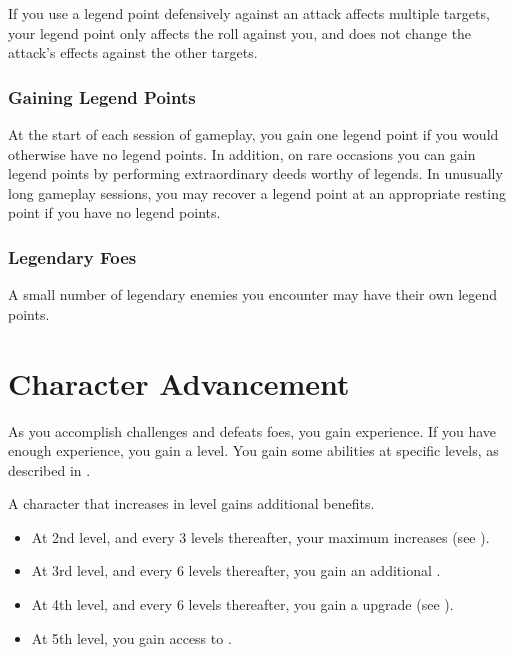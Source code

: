         If you use a legend point defensively against an attack affects multiple targets, your legend point only affects the roll against you, and does not change the attack's effects against the other targets.

    \subsubsection{Gaining Legend Points}
        At the start of each session of gameplay, you gain one legend point if you would otherwise have no legend points.
        In addition, on rare occasions you can gain legend points by performing extraordinary deeds worthy of legends.
        In unusually long gameplay sessions, you may recover a legend point at an appropriate resting point if you have no legend points.

    \subsubsection{Legendary Foes}
        A small number of legendary enemies you encounter may have their own legend points.

\section{Character Advancement}\label{Character Advancement}

    As you accomplish challenges and defeats foes, you gain experience.
    If you have enough experience, you gain a level.
    You gain some abilities at specific levels, as described in .

    A character that increases in level gains additional benefits.
    \begin{itemize}
        \item At 2nd level, and every 3 levels thereafter, your maximum  increases (see ).
        \item At 3rd level, and every 6 levels thereafter, you gain an additional .
        \item At 4th level, and every 6 levels thereafter, you gain a  upgrade (see ).
        \item At 5th level, you gain access to .
    \end{itemize}

